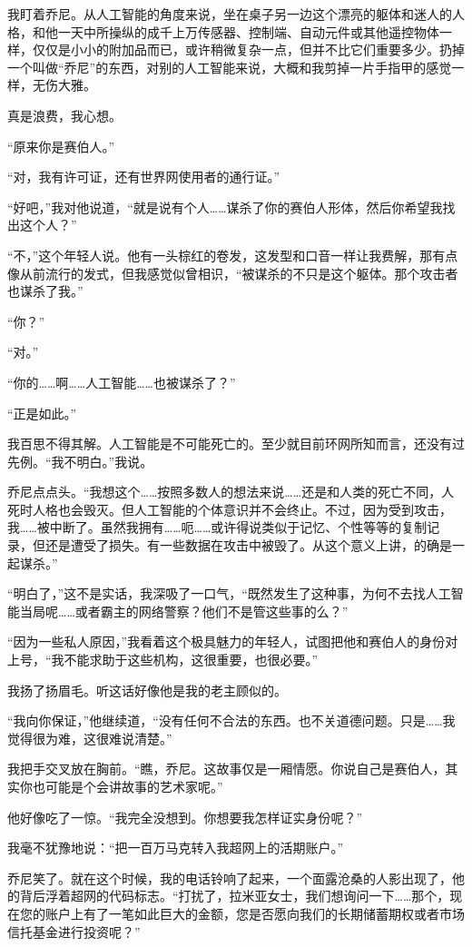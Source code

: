 \documentclass[AutoFakeBold=true]{book}
\begin{document}
我盯着乔尼。从人工智能的角度来说，坐在桌子另一边这个漂亮的躯体和迷人的人格，和他一天中所操纵的成千上万传感器、控制端、自动元件或其他遥控物体一样，仅仅是小小的附加品而已，或许稍微复杂一点，但并不比它们重要多少。扔掉一个叫做``乔尼''的东西，对别的人工智能来说，大概和我剪掉一片手指甲的感觉一样，无伤大雅。

{\kaishu 真是浪费}，我心想。

``原来你是赛伯人。''

``对，我有许可证，还有世界网使用者的通行证。''

``好吧，''我对他说道，``就是说有个人……谋杀了你的赛伯人形体，然后你希望我找出这个人？''

``不，''这个年轻人说。他有一头棕红的卷发，这发型和口音一样让我费解，那有点像从前流行的发式，但我感觉{\kaishu 似曾相识}，``被谋杀的不只是这个躯体。那个攻击者也谋杀了我。''

``你？''

``对。''

``你的……啊……人工智能……也被谋杀了？''

``正是如此。''

我百思不得其解。人工智能是不可能死亡的。至少就目前环网所知而言，还没有过先例。``我不明白。''我说。

乔尼点点头。``我想这个……按照多数人的想法来说……还是和人类的死亡不同，人死时人格也会毁灭。但人工智能的个体意识并不会终止。不过，因为受到攻击，我……被中断了。虽然我拥有……呃……或许得说类似于记忆、个性等等的复制记录，但还是遭受了损失。有一些数据在攻击中被毁了。从这个意义上讲，的确是一起谋杀。''

``明白了，''这不是实话，我深吸了一口气，``既然发生了这种事，为何不去找人工智能当局呢……或者霸主的网络警察？他们不是管这些事的么？''

``因为一些私人原因，''我看着这个极具魅力的年轻人，试图把他和赛伯人的身份对上号，``我不能求助于这些机构，这很重要，也很必要。''

我扬了扬眉毛。听这话好像他是我的老主顾似的。

``我向你保证，''他继续道，``没有任何不合法的东西。也不关道德问题。只是……我觉得很为难，这很难说清楚。''

我把手交叉放在胸前。``瞧，乔尼。这故事仅是一厢情愿。你说自己是赛伯人，其实你也可能是个会讲故事的艺术家呢。''

他好像吃了一惊。``我完全没想到。你想要我怎样证实身份呢？''

我毫不犹豫地说：``把一百万马克转入我超网上的活期账户。''

乔尼笑了。就在这个时候，我的电话铃响了起来，一个面露沧桑的人影出现了，他的背后浮着超网的代码标志。``打扰了，拉米亚女士，我们想询问一下……那个，现在您的账户上有了一笔如此巨大的金额，您是否愿向我们的长期储蓄期权或者市场信托基金进行投资呢？''
\end{document}
